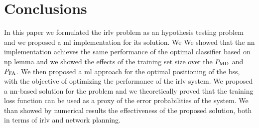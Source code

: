 \documentclass[conference]{IEEEtran}
\begin{document}
\section{Conclusions}
In this paper we formulated the \ac{irlv} problem as an hypothesis testing problem and we proposed a \ac{ml} implementation for its solution. We We showed that the \ac{nn} implementation achieves the same performance of the optimal classifier based on \ac{np} lemma and we showed the effects of the training set size over the $P_{\rm MD}$ and $P_{\rm FA}$. We then proposed a \ac{ml} approach for the optimal positioning of the \acp{bs}, with the objective of optimizing the performance of the \ac{irlv} system. We proposed a \ac{nn}-based solution for the problem and we theoretically proved that the training loss function can be used as a proxy of the error probabilities of the system. We than showed by numerical results the effectiveness of the proposed solution, both in terms of \ac{irlv} and network planning.
\renewcommand*{\bibfont}{\footnotesize}

\printbibliography
\balance
\end{document}
